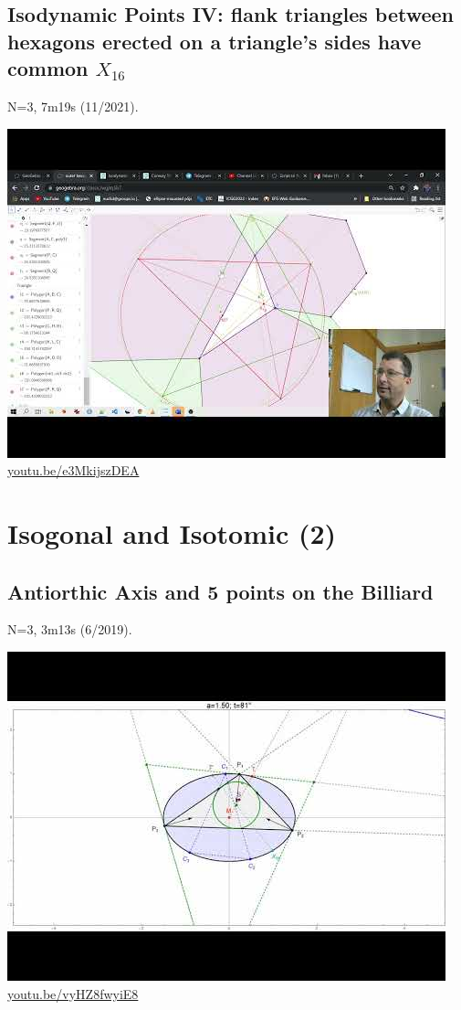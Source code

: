 \documentclass[12pt]{amsart}
\begin{document}
\subsection{Isodynamic Points IV: flank triangles between hexagons erected on a triangle's sides have common $X_{16}$}
\label{vid:e3MkijszDEA}
\noindent N=3, 7m19s (11/2021). 
\begin{center}\includegraphics[width=.5\textwidth]{pics/e3MkijszDEA.jpg} \\ 
\href{https://youtu.be/e3MkijszDEA}{\url{youtu.be/e3MkijszDEA}}\end{center}
% 

\section{Isogonal and Isotomic (2)}

\subsection{Antiorthic Axis and 5 points on the Billiard}
\label{vid:vyHZ8fwyiE8}
\noindent N=3, 3m13s (6/2019). 
\begin{center}\includegraphics[width=.5\textwidth]{pics/vyHZ8fwyiE8.jpg} \\ 
\href{https://youtu.be/vyHZ8fwyiE8}{\url{youtu.be/vyHZ8fwyiE8}}\end{center}
% 
\end{document}
